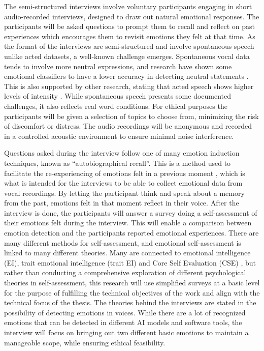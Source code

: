 The semi-structured interviews involve voluntary participants engaging in short audio-recorded interviews, designed to draw out natural emotional responses. The participants will be asked questions to prompt them to recall and reflect on past experiences which encourages them to revisit emotions they felt at that time. 
As the format of the interviews are semi-structured and involve spontaneous speech unlike acted datasets, a well-known challenge emerges. Spontaneous vocal data tends to involve more neutral expressions, and research have shown some emotional classifiers to have a lower accuracy in detecting neutral statements \autocite{Cao2015}. This is also supported by other research, stating that acted speech shows higher levels of intensity \autocite{Chakraborty2016}. While spontaneous speech presents some documented challenges, it also reflects real word conditions.
For ethical purposes the participants will be given a selection of topics to choose from, minimizing the risk of discomfort or distress. The audio recordings will be anonymous and recorded in a controlled acoustic environment to ensure minimal noise interference.

Questions asked during the interview follow one of many emotion induction techniques, known as “autobiographical recall”. This is a method used to facilitate the re-experiencing of emotions felt in a previous moment \autocite{Siedlecka2019}, which is what is intended for the interviews to be able to collect emotional data from vocal recordings. By letting the participant think and speak about a memory from the past, emotions felt in that moment reflect in their voice.
After the interview is done, the participants will answer a survey doing a self-assessment of their emotions felt during the interview. This will enable a comparison between emotion detection and the participants reported emotional experiences.
There are many different methods for self-assessment, and emotional self-assessment is linked to many different theories. Many are connected to emotional intelligence (EI), trait emotional intelligence (trait EI) and Core Self Evaluation (CSE) \autocite{Montasem2013}, but rather than conducting a comprehensive exploration of different psychological theories in self-assessment, this research will use simplified surveys at a basic level for the purpose of fulfilling the technical objectives of the work and align with the technical focus of the thesis.
The theories behind the interviews are stated in the possibility of detecting emotions in voices. While there are a lot of recognized emotions that can be detected in different AI models and software tools, the interview will focus on bringing out two different basic emotions to maintain a manageable scope, while ensuring ethical feasibility.

